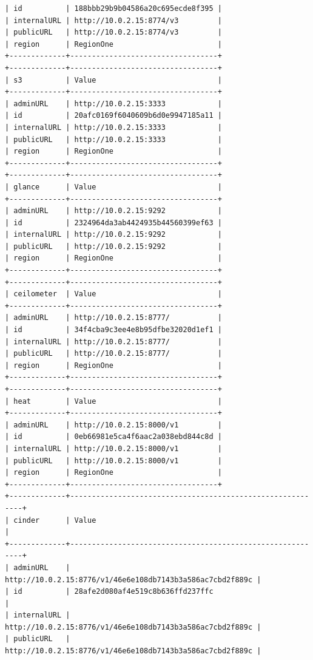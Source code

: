\documentclass{article}
\begin{document}
\begin{lstlisting}[style=miniBash]
| id          | 188bbb29b9b04586a20c695ecde8f395 |
| internalURL | http://10.0.2.15:8774/v3         |
| publicURL   | http://10.0.2.15:8774/v3         |
| region      | RegionOne                        |
+-------------+----------------------------------+
+-------------+----------------------------------+
| s3          | Value                            |
+-------------+----------------------------------+
| adminURL    | http://10.0.2.15:3333            |
| id          | 20afc0169f6040609b6d0e9947185a11 |
| internalURL | http://10.0.2.15:3333            |
| publicURL   | http://10.0.2.15:3333            |
| region      | RegionOne                        |
+-------------+----------------------------------+
+-------------+----------------------------------+
| glance      | Value                            |
+-------------+----------------------------------+
| adminURL    | http://10.0.2.15:9292            |
| id          | 2324964da3ab4424935b44560399ef63 |
| internalURL | http://10.0.2.15:9292            |
| publicURL   | http://10.0.2.15:9292            |
| region      | RegionOne                        |
+-------------+----------------------------------+
+-------------+----------------------------------+
| ceilometer  | Value                            |
+-------------+----------------------------------+
| adminURL    | http://10.0.2.15:8777/           |
| id          | 34f4cba9c3ee4e8b95dfbe32020d1ef1 |
| internalURL | http://10.0.2.15:8777/           |
| publicURL   | http://10.0.2.15:8777/           |
| region      | RegionOne                        |
+-------------+----------------------------------+
+-------------+----------------------------------+
| heat        | Value                            |
+-------------+----------------------------------+
| adminURL    | http://10.0.2.15:8000/v1         |
| id          | 0eb66981e5ca4f6aac2a038ebd844c8d |
| internalURL | http://10.0.2.15:8000/v1         |
| publicURL   | http://10.0.2.15:8000/v1         |
| region      | RegionOne                        |
+-------------+----------------------------------+
+-------------+-----------------------------------------------------------+
| cinder      | Value                                                     |
+-------------+-----------------------------------------------------------+
| adminURL    | http://10.0.2.15:8776/v1/46e6e108db7143b3a586ac7cbd2f889c |
| id          | 28afe2d080af4e519c8b636ffd237ffc                          |
| internalURL | http://10.0.2.15:8776/v1/46e6e108db7143b3a586ac7cbd2f889c |
| publicURL   | http://10.0.2.15:8776/v1/46e6e108db7143b3a586ac7cbd2f889c |

\end{lstlisting}
\end{document}

